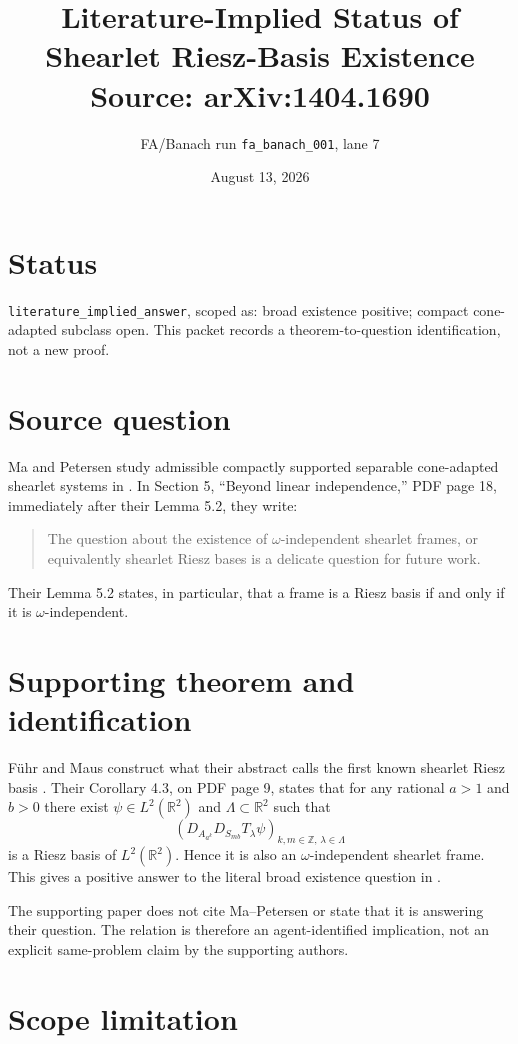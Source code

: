 \documentclass[11pt]{article}
\title{Literature-Implied Status of Shearlet Riesz-Basis Existence\\\large Source: arXiv:1404.1690}
\author{FA/Banach run \texttt{fa\_banach\_001}, lane 7}
\date{August 13, 2026}
\newcommand{\R}{\mathbb{R}}
\newcommand{\Z}{\mathbb{Z}}
\begin{document}
\maketitle

\section*{Status}

\texttt{literature\_implied\_answer}, scoped as: broad existence positive;
compact cone-adapted subclass open. This packet records a theorem-to-question
identification, not a new proof.

\section*{Source question}

Ma and Petersen study admissible compactly supported separable cone-adapted
shearlet systems in \cite{MaPetersen}. In Section 5, ``Beyond linear
independence,'' PDF page 18, immediately after their Lemma 5.2, they write:
\begin{quote}
The question about the existence of $\omega$-independent shearlet frames, or
equivalently shearlet Riesz bases is a delicate question for future work.
\end{quote}
Their Lemma 5.2 states, in particular, that a frame is a Riesz basis if and
only if it is $\omega$-independent.

\section*{Supporting theorem and identification}

F\"uhr and Maus construct what their abstract calls the first known shearlet
Riesz basis \cite{FuhrMaus}. Their Corollary 4.3, on PDF page 9, states that
for any rational $a>1$ and $b>0$ there exist $\psi\in L^2(\R^2)$ and
$\Lambda\subset\R^2$ such that
\[
 \left(D_{A_{a^k}}D_{S_{mb}}T_\lambda\psi\right)_
 {k,m\in\Z,\,\lambda\in\Lambda}
\]
is a Riesz basis of $L^2(\R^2)$. Hence it is also an
$\omega$-independent shearlet frame. This gives a positive answer to the
literal broad existence question in \cite{MaPetersen}.

The supporting paper does not cite Ma--Petersen or state that it is answering
their question. The relation is therefore an agent-identified implication,
not an explicit same-problem claim by the supporting authors.

\section*{Scope limitation}
\end{document}
